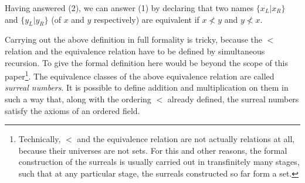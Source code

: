 \documentclass[twoside,11pt]{article}
\begin{document}
Having answered (2), we can answer (1) by declaring that two names
$\{x_L|x_R\}$ and $\{y_L|y_R\}$ (of $x$ and $y$ respectively) are equivalent
if $x\not<y$ and $y\not< x$.

Carrying out the above definition in full formality is tricky,
because the $<$ relation and the equivalence relation have to be
defined by simultaneous recursion.
To give the formal definition here would be beyond the scope of this
paper\footnote{Technically, $<$ and the equivalence relation are not actually
relations at all, because their
universes are not sets. For this and other reasons, the formal construction of the surreals
is usually carried out in transfinitely many stages, such that at any particular stage,
the surreals constructed so far form a set.}.
The equivalence classes of the above equivalence relation are called
\emph{surreal numbers}. It is possible to define addition and multiplication
on them in such a way that, along with the ordering $<$ already defined,
the surreal numbers satisfy the axioms of an ordered field.
\end{document}
